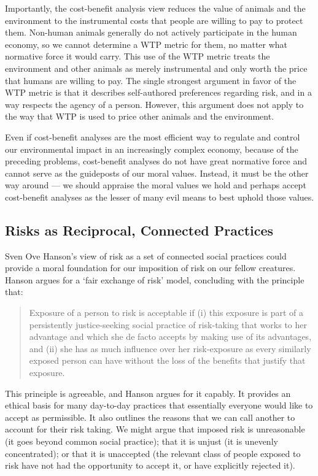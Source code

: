 Importantly, the cost-benefit analysis view reduces the value of animals and
the environment to the instrumental costs that people are willing to pay to
protect them. Non-human animals generally do not actively participate in the
human economy, so we cannot determine a WTP metric for them, no matter what
normative force it would carry. This use of the WTP metric treats the
environment and other animals as merely instrumental and only worth the price
that humans are willing to pay. The single strongest argument in favor of the
WTP metric is that it describes self-authored preferences regarding risk, and
in a way respects the agency of a person. However, this argument does not apply
to the way that WTP is used to price other animals and the environment.

Even if cost-benefit analyses are the most efficient way to regulate and
control our environmental impact in an increasingly complex economy, because of
the preceding problems, cost-benefit analyses do not have great normative force
and cannot serve as the guideposts of our moral values.  Instead, it must be
the other way around --- we should appraise the moral values we hold and
perhaps accept cost-benefit analyses as the lesser of many evil means to best
uphold those values.

\subsection{Risks as Reciprocal, Connected Practices}

Sven Ove Hanson’s view of risk as a set of connected social practices could
provide a moral foundation for our imposition of risk on our fellow creatures.
Hanson argues for a ‘fair exchange of risk’ model, concluding with the principle
that:

\begin{quote}
  Exposure of a person to risk is acceptable if (i) this exposure is part of a
  persistently justice-seeking social practice of risk-taking that works to her
  advantage and which she de facto accepts by making use of its advantages, and
  (ii) she has as much influence over her risk-exposure as every similarly
  exposed person can have without the loss of the benefits that justify that
  exposure.\autocite[107]{hanson}
\end{quote}

This principle is agreeable, and Hanson argues for it capably. It provides an
ethical basis for many day-to-day practices that essentially everyone would
like to accept as permissible.  It also outlines the reasons that  we can call
another to account for their risk taking.  We might argue that imposed risk is
unreasonable (it goes beyond common social practice); that it is unjust (it is
unevenly concentrated); or that it is unaccepted (the relevant class of people
exposed to risk have not had the opportunity to accept it, or have explicitly
rejected it).


